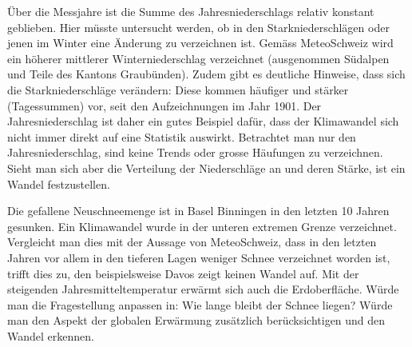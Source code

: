 \begin{refsection}
Über die Messjahre ist die Summe des Jahresniederschlags relativ konstant geblieben. Hier müsste untersucht werden, ob in den Starkniederschlägen oder jenen im Winter eine Änderung zu verzeichnen ist. Gemäss MeteoSchweiz wird ein höherer mittlerer Winterniederschlag verzeichnet (ausgenommen Südalpen und Teile des Kantons Graubünden). Zudem gibt es deutliche Hinweise, dass sich die Starkniederschläge verändern: Diese kommen häufiger und stärker (Tagessummen) vor, seit den Aufzeichnungen im Jahr 1901. Der Jahresniederschlag ist daher ein gutes Beispiel dafür, dass der Klimawandel sich nicht immer direkt auf eine Statistik auswirkt. Betrachtet man nur den Jahresniederschlag, sind keine Trends oder grosse Häufungen zu verzeichnen. Sieht man sich aber die Verteilung der Niederschläge an und deren Stärke, ist ein Wandel festzustellen.

Die gefallene Neuschneemenge ist in Basel Binningen in den letzten 10 Jahren gesunken. Ein Klimawandel wurde in der unteren extremen Grenze verzeichnet. Vergleicht man dies mit der Aussage von MeteoSchweiz, dass in den letzten Jahren vor allem in den tieferen Lagen weniger Schnee verzeichnet worden ist, trifft dies zu, den beispielsweise Davos zeigt keinen Wandel auf. Mit der steigenden Jahresmitteltemperatur erwärmt sich auch die Erdoberfläche. Würde man die Fragestellung anpassen in: Wie lange bleibt der Schnee liegen? Würde man den Aspekt der globalen Erwärmung zusätzlich berücksichtigen und den Wandel erkennen.



\end{refsection}
